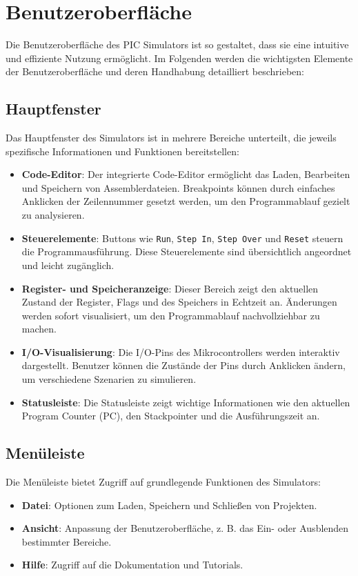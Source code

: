 \chapter{Benutzeroberfläche}

Die Benutzeroberfläche des PIC Simulators ist so gestaltet, dass sie eine intuitive und effiziente Nutzung ermöglicht. Im Folgenden werden die wichtigsten Elemente der Benutzeroberfläche und deren Handhabung detailliert beschrieben:

\section{Hauptfenster}
Das Hauptfenster des Simulators ist in mehrere Bereiche unterteilt, die jeweils spezifische Informationen und Funktionen bereitstellen:
\begin{itemize}
    \item \textbf{Code-Editor}: Der integrierte Code-Editor ermöglicht das Laden, Bearbeiten und Speichern von Assemblerdateien. Breakpoints können durch einfaches Anklicken der Zeilennummer gesetzt werden, um den Programmablauf gezielt zu analysieren.
    \item \textbf{Steuerelemente}: Buttons wie \texttt{Run}, \texttt{Step In}, \texttt{Step Over} und \texttt{Reset} steuern die Programmausführung. Diese Steuerelemente sind übersichtlich angeordnet und leicht zugänglich.
    \item \textbf{Register- und Speicheranzeige}: Dieser Bereich zeigt den aktuellen Zustand der Register, Flags und des Speichers in Echtzeit an. Änderungen werden sofort visualisiert, um den Programmablauf nachvollziehbar zu machen.
    \item \textbf{I/O-Visualisierung}: Die I/O-Pins des Mikrocontrollers werden interaktiv dargestellt. Benutzer können die Zustände der Pins durch Anklicken ändern, um verschiedene Szenarien zu simulieren.
    \item \textbf{Statusleiste}: Die Statusleiste zeigt wichtige Informationen wie den aktuellen Program Counter (PC), den Stackpointer und die Ausführungszeit an.
\end{itemize}

\section{Menüleiste}
Die Menüleiste bietet Zugriff auf grundlegende Funktionen des Simulators:
\begin{itemize}
    \item \textbf{Datei}: Optionen zum Laden, Speichern und Schließen von Projekten.
    \item \textbf{Ansicht}: Anpassung der Benutzeroberfläche, z. B. das Ein- oder Ausblenden bestimmter Bereiche.
    \item \textbf{Hilfe}: Zugriff auf die Dokumentation und Tutorials.
\end{itemize}


